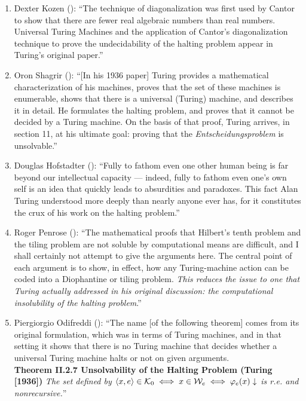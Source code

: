 \documentclass[12pt]{amsart}
\begin{document}
\begin{enumerate}
    \bigskip


    \item Dexter Kozen (\cite[pp. 243-244]{kozen2012automata}): \enquote{The technique of diagonalization was first used by Cantor to show that there are fewer real algebraic numbers than real numbers. Universal Turing Machines and the application of Cantor's diagonalization technique to prove the undecidability of the halting problem appear in Turing's original paper.} 

    \bigskip 

    \item Oron Shagrir (\cite[p. 3]{shagrir2006godel}): \enquote{[In his 1936 paper] Turing provides a mathematical characterization of his machines, proves that the set of these machines is enumerable, shows that there is a universal (Turing) machine, and describes it in detail. He formulates the halting problem, and proves that it cannot be decided by a Turing machine. On the basis of that proof, Turing arrives, in section 11, at his ultimate goal: proving that the \textit{Entscheidungsproblem} is unsolvable.}

    \bigskip

    \item Douglas Hofstadter (\cite[p. XII]{hofstadter2004turing}): \enquote{Fully to fathom even one other human being is far beyond our intellectual capacity --- indeed, fully to fathom even one's own self is an idea that quickly leads to absurdities and paradoxes. This fact Alan Turing understood more deeply than nearly anyone ever has, for it constitutes the crux of his work on the halting problem.}

    \bigskip


    \item Roger Penrose (\cite[p. 30, our emphasis]{penrose1994shadows}): \enquote{The mathematical proofs that Hilbert's tenth problem and the tiling problem are not soluble by computational means are difficult, and I shall certainly not attempt to give the arguments here. The central point of each argument is to show, in effect, how any Turing-machine action can be coded into a Diophantine or tiling problem. \textit{This reduces the issue to one that Turing actually addressed in his original discussion: the computational insolubility of the halting problem}.}

    \bigskip

\enlargethispage{20pt}
    \item Piergiorgio Odifreddi (\cite[p. 150]{odifreddi1992classical}):
    \enquote{The name [of the following theorem] comes from its original formulation, which was in terms of Turing machines, and in that setting it shows that there is no Turing machine that decides whether a universal Turing machine halts or not on given arguments.\\[1ex] 
    \textbf{Theorem II.2.7 Unsolvability of the Halting Problem (Turing [1936])} \textit{The set defined by $\braket{x,e} \in \mathcal{K}_0 \iff x \in \mathcal{W}_e \iff \varphi_e(x)\downarrow$ is r.e. and nonrecursive.}}


\end{enumerate}
\end{document}
